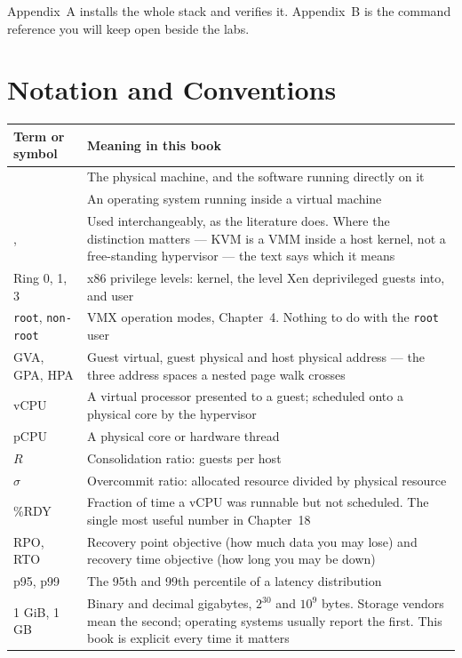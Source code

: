Appendix~A installs the whole stack and verifies it. Appendix~B is the command
reference you will keep open beside the labs.

\newpage

\chapter*{Notation and Conventions}

\begin{longtable}{@{}L{3.4cm}L{11.8cm}@{}}
\toprule
{}
\textbf{Term or symbol} & \textbf{Meaning in this book} \\
\midrule
\endhead
{} & The physical machine, and the software running directly on it \\
 & An operating system running inside a virtual machine \\
,  & Used interchangeably, as the literature does.
Where the distinction matters --- KVM is a VMM inside a host kernel, not a
free-standing hypervisor --- the text says which it means \\
Ring 0, 1, 3 & x86 privilege levels: kernel, the level Xen deprivileged guests
into, and user \\
\texttt{root}, \texttt{non-root} & VMX operation modes, Chapter~4. Nothing to do
with the \texttt{root} user \\
GVA, GPA, HPA & Guest virtual, guest physical and host physical address --- the
three address spaces a nested page walk crosses \\
vCPU & A virtual processor presented to a guest; scheduled onto a physical core
by the hypervisor \\
pCPU & A physical core or hardware thread \\
$R$ & Consolidation ratio: guests per host \\
$\sigma$ & Overcommit ratio: allocated resource divided by physical resource \\
\%RDY & Fraction of time a vCPU was runnable but not scheduled. The single most
useful number in Chapter~18 \\
RPO, RTO & Recovery point objective (how much data you may lose) and recovery
time objective (how long you may be down) \\
p95, p99 & The 95th and 99th percentile of a latency distribution \\
1 GiB, 1 GB & Binary and decimal gigabytes, $2^{30}$ and $10^{9}$ bytes. Storage
vendors mean the second; operating systems usually report the first. This book
is explicit every time it matters \\
\bottomrule
\end{longtable}

